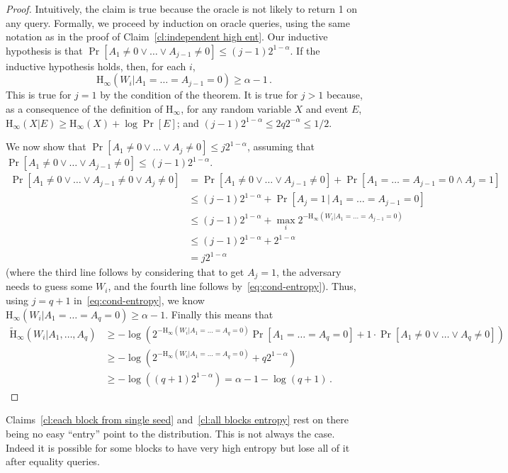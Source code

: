 \documentclass[11pt]{article}
\newcommand{\clref}[1]{\mbox{Claim~\ref{#1}}}
\newcommand{\Hoo}{\mathrm{H}_\infty}
\newcommand{\Hav}{\tilde{\mathrm{H}}_\infty}
\begin{document}
\begin{proof}
Intuitively, the claim is true because the oracle is not likely to return 1 on any query. Formally, we proceed by induction on oracle queries,
using the same notation as in the proof of   \clref{cl:independent high ent}. Our inductive hypothesis is
that $\Pr[A_1\neq 0 \vee \dots \vee A_{j-1}\neq 0] \leq (j-1)2^{1-\alpha}$.  If the inductive hypothesis holds, then, for each $i$,  
\begin{equation}
\label{eq:cond-entropy}
\Hoo(W_i | A_1= \dots= A_{j-1}=0) \ge \alpha-1\,.
\end{equation}
This is true for $j=1$ by the condition of the theorem. It is true for $j>1$ because, as a consequence of the definition of $\Hoo$,
for any random variable $X$ and event $E$, $\Hoo(X|E)\ge \Hoo(X)+\log\Pr[E]$; and $(j-1) 2^{1-\alpha}\leq 2 q 2^{-\alpha} \leq 1/2$.  

We now show that $\Pr[A_1\neq 0 \vee \dots \vee A_{j}\neq 0] \leq j2^{1-\alpha}$, assuming that $\Pr[A_1\neq 0 \vee \dots \vee A_{j-1}\neq 0] \leq (j-1)2^{1-\alpha}$.
\begin{align*}
\Pr[A_1\neq 0 \vee \dots \vee A_{j-1}\neq 0 \vee A_j\neq 0] & = 
\Pr[A_1\neq 0 \vee \dots \vee A_{j-1}\neq 0]+\Pr[A_1=\dots = A_{j-1}=0 \wedge A_j=1]\\
& \le  (j-1)2^{1-\alpha}+\Pr[A_j=1\,|\,A_1=\dots = A_{j-1}=0]\\
& \le  (j-1)2^{1-\alpha}+\max_i 2^{-\Hoo(W_i | A_1=\dots =A_{j-1}=0)}\\
& \le  (j-1)2^{1-\alpha}+ 2^{1-\alpha}\\
& = j 2^{1-\alpha}
\end{align*}
(where the third line follows by considering that to get $A_j=1$, the adversary needs to guess some $W_i$, and the fourth line follows by~\eqref{eq:cond-entropy}).
Thus, using $j=q+1$ in~\eqref{eq:cond-entropy},
 we know $\Hoo(W_i | A_1= \dots= A_q=0) \ge \alpha-1$.  Finally this means that
\begin{align*}
\Hav(W_i | A_1,\dots, A_q) &\ge -\log \left( 2^{-\Hoo(W_i | A_1= \dots= A_q=0)}\Pr[A_1=\dots=A_q=0]+1\cdot \Pr[A_1\neq 0 \vee \dots \vee  A_q\neq 0] \right)\\
& \ge -\log \left(  2^{-\Hoo(W_i | A_1= \dots= A_q=0)}+q2^{1-\alpha} \right)\\
& \ge -\log \left(  (q+1) 2^{1-\alpha}\right) = \alpha-1-\log(q+1)\,.
\end{align*}
\end{proof}

Claims~\ref{cl:each block from single seed} and~\ref{cl:all blocks entropy} rest on there being no easy ``entry'' point to the distribution.  This is not always the case.  Indeed it is possible for some blocks to have very high entropy but lose all of it after equality queries.
\end{document}

